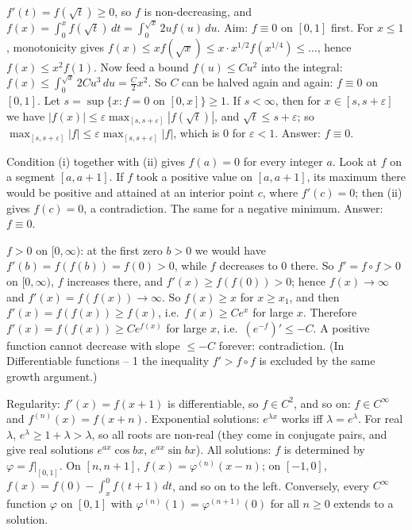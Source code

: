 \documentclass[11pt,a4paper]{article}
\begin{document}

 \(f'(t)=f(\sqrt t)\ge0\), so \(f\) is non-decreasing, and \(f(x)=\int_0^xf(\sqrt t)\,dt=\int_0^{\sqrt x}2uf(u)\,du\). Aim: \(f\equiv0\) on \([0,1]\) first.
 For \(x\le1\), monotonicity gives \(f(x)\le xf(\sqrt x)\le x\cdot x^{1/2}f(x^{1/4})\le\dots\), hence \(f(x)\le x^2f(1)\). Now feed a bound \(f(u)\le Cu^2\) into the integral: \(f(x)\le\int_0^{\sqrt x}2Cu^3\,du=\frac C2x^2\). So \(C\) can be halved again and again: \(f\equiv0\) on \([0,1]\).
 Let \(s=\sup\{x: f=0\text{ on }[0,x]\}\ge1\). If \(s\lt\infty\), then for \(x\in[s,s+\varepsilon]\) we have \(|f(x)|\le\varepsilon\max_{[s,s+\varepsilon]}|f(\sqrt t)|\), and \(\sqrt t\le s+\varepsilon\); so \(\max_{[s,s+\varepsilon]}|f|\le\varepsilon\max_{[s,s+\varepsilon]}|f|\), which is \(0\) for \(\varepsilon\lt1\). Answer: \(f\equiv0\).

 Condition (i) together with (ii) gives \(f(a)=0\) for every integer \(a\). Look at \(f\) on a segment \([a,a+1]\).
 If \(f\) took a positive value on \([a,a+1]\), its maximum there would be positive and attained at an interior point \(c\), where \(f'(c)=0\); then (ii) gives \(f(c)=0\), a contradiction. The same for a negative minimum. Answer: \(f\equiv0\).

 \(f\gt0\) on \([0,\infty)\): at the first zero \(b\gt0\) we would have \(f'(b)=f(f(b))=f(0)\gt0\), while \(f\) decreases to \(0\) there. So \(f'=f\circ f\gt0\) on \([0,\infty)\), \(f\) increases there, and \(f'(x)\ge f(f(0))\gt0\); hence \(f(x)\to\infty\) and \(f'(x)=f(f(x))\to\infty\).
 So \(f(x)\ge x\) for \(x\ge x_1\), and then \(f'(x)=f(f(x))\ge f(x)\), i.e.\ \(f(x)\ge Ce^x\) for large \(x\).
 Therefore \(f'(x)=f(f(x))\ge Ce^{f(x)}\) for large \(x\), i.e.\ \((e^{-f})'\le-C\). A positive function cannot decrease with slope \(\le-C\) forever: contradiction. (In Differentiable functions -- 1 the inequality \(f'\gt f\circ f\) is excluded by the same growth argument.)

 Regularity: \(f'(x)=f(x+1)\) is differentiable, so \(f\in C^2\), and so on: \(f\in C^\infty\) and \(f^{(n)}(x)=f(x+n)\).
 Exponential solutions: \(e^{\lambda x}\) works iff \(\lambda=e^\lambda\). For real \(\lambda\), \(e^\lambda\ge1+\lambda\gt\lambda\), so all roots are non-real (they come in conjugate pairs, and give real solutions \(e^{ax}\cos bx\), \(e^{ax}\sin bx\)).
 All solutions: \(f\) is determined by \(\varphi=f|_{[0,1]}\). On \([n,n+1]\), \(f(x)=\varphi^{(n)}(x-n)\); on \([-1,0]\), \(f(x)=f(0)-\int_x^0f(t+1)\,dt\), and so on to the left. Conversely, every \(C^\infty\) function \(\varphi\) on \([0,1]\) with \(\varphi^{(n)}(1)=\varphi^{(n+1)}(0)\) for all \(n\ge0\) extends to a solution.
\end{document}
